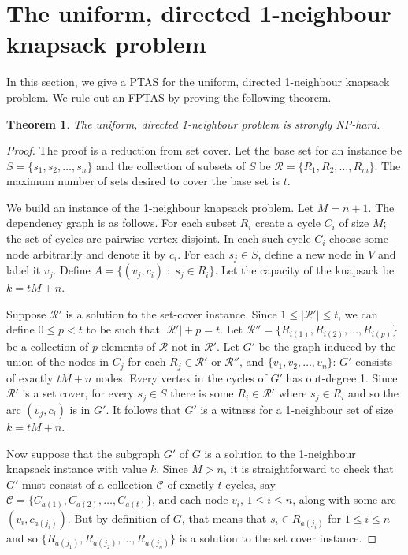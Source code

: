 \documentclass[12pt]{article}
\newtheorem{theorem}{Theorem}
\begin{document}
\section{The uniform, directed 1-neighbour knapsack problem} \label{sec:ud1n}

In this section, we give a PTAS for the uniform, directed 1-neighbour
knapsack problem.  We rule out an FPTAS by proving the following theorem.



\begin{theorem} \label{thm:ud1n-hard}
The uniform, directed 1-neighbour problem is strongly NP-hard.
\end{theorem}




\begin{proof}
The proof is a reduction from set cover.  Let the base set for an
instance be $S=\{ s_1, s_2, \ldots, s_{n}\}$ and the collection of
subsets of $S$ be ${\mathcal R}=\{R_1, R_2, \ldots, R_{m}\}$.  The maximum
number of sets desired to cover the base set is $t$.

We build an instance of the 1-neighbour knapsack problem.  Let $M =
n+1$.  The dependency graph is as follows.  For
each subset $R_i$ create a cycle $C_i$ of size $M$; the set of cycles are
pairwise vertex disjoint.  In each such cycle $C_i$ choose some node
arbitrarily and denote it by $c_i$.  For each $s_j\in S$, define a new
node in $V$ and label it $v_j$.  Define $A=\{(v_j,c_i)\; : \; s_j\in
R_i\}$.   Let the capacity of the knapsack be $k = tM+n$.

Suppose ${\mathcal R}'$ is a solution to the set-cover instance.  Since
$1\le |{\mathcal R}'|\le t$, we can define $0\le p <t$ to be such that
$|{\mathcal R}'|+p=t$.  Let ${\mathcal R}''=\{R_{i(1)}, R_{i(2)}, \ldots,
R_{i(p)}\}$ be a collection of $p$ elements of $\mathcal R$ not in ${\mathcal
R}'$. Let $G'$ be the graph induced by the union of the nodes in
$C_j$ for each $R_j\in {\mathcal R}'$ or ${\mathcal R}''$, and $\{v_1, v_2,
\ldots, v_n\}$: $G'$ consists of exactly $tM+n$ nodes.  Every vertex
in the cycles of $G'$ has out-degree 1.  Since ${\mathcal R}'$ is a set
cover, for every $s_j\in S$ there is some $R_i\in {\mathcal R}'$ where
$s_j\in R_i$ and so the arc $(v_j, c_i)$ is in $G'$.  It follows that
$G'$ is a witness for a 1-neighbour set of size $k=tM+n$.

Now suppose that the subgraph $G'$ of $G$ is a solution to the
1-neighbour knapsack instance with value $k$.  Since $M>n$, it is straightforward to
check that $G'$ must consist of a collection $\mathcal C$ of exactly $t$
cycles, say ${\mathcal C}=\{C_{a(1)}, C_{a(2)}, \ldots, C_{a(t)}\}$, and
each node $v_i$, $1\le i\le n$, along with some arc
$(v_i,c_{a(j_i)})$.  But by definition of $G$, that means that $s_i\in
R_{a(j_i)}$ for $1\le i\le n$ and so $\{ R_{a(j_1)},
R_{a(j_2)},\ldots , R_{a(j_n)}\}$ is a solution to the set cover
instance.
\end{proof}
\end{document}
